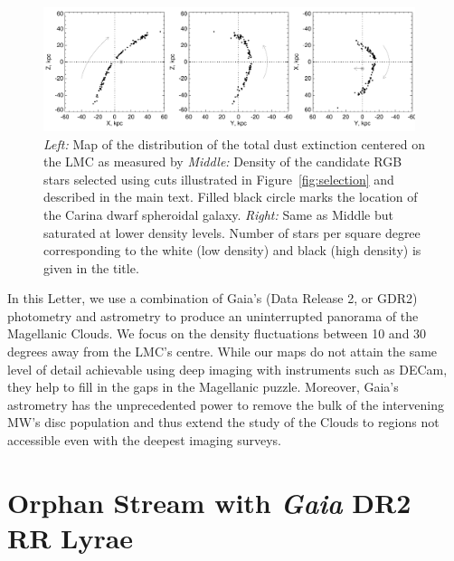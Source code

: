 \documentclass[a4paper,useAMS,usenatbib]{mnras}
\newcommand{\gaia}{\textit{Gaia} }
\begin{document}
%
\begin{figure}
  \centering
  \includegraphics[width=0.97\textwidth]{orphan_paper_xyz_members.pdf}
  \caption[]{ {\it Left:} Map of the distribution of the total dust
    extinction centered on the LMC as measured by \citet{SFD} {\it
      Middle:} Density of the candidate RGB stars selected using cuts
    illustrated in Figure~\ref{fig:selection} and described in the
    main text. Filled black circle marks the location of the Carina
    dwarf spheroidal galaxy. {\it Right:} Same as Middle but saturated
    at lower density levels. Number of stars per square degree
    corresponding to the white (low density) and black (high density)
    is given in the title.}
   \label{fig:xyzmem}
\end{figure}
%

In this Letter, we use a combination of Gaia's (Data Release 2, or
GDR2) photometry and astrometry to produce an uninterrupted panorama
of the Magellanic Clouds. We focus on the density fluctuations between
10 and 30 degrees away from the LMC's centre. While our maps do not
attain the same level of detail achievable using deep imaging with
instruments such as DECam, they help to fill in the gaps in the
Magellanic puzzle. Moreover, Gaia's astrometry has the
unprecedented power to remove the bulk of the intervening MW's
disc population and thus extend the study of the Clouds to regions
not accessible even with the deepest imaging surveys.


\section{Orphan Stream with \gaia DR2 RR Lyrae}
\end{document}
